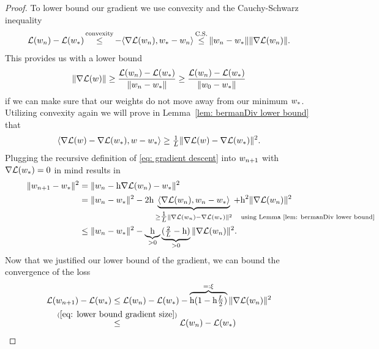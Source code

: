 \begin{proof}
	To lower bound our gradient we use convexity and the Cauchy-Schwarz inequality
	\begin{align*}
		\Loss(\weights_n)-\Loss(\minimum)
		\xle{\text{convexity}} -\langle \nabla\Loss(\weights_n), \minimum-\weights_n\rangle
		\xle{\text{C.S.}} \|\weights_n - \minimum\| \|\nabla\Loss(\weights_n)\|.
	\end{align*}
	This provides us with a lower bound 
	\begin{align}\label{eq: lower bound gradient size}
		\|\nabla\mathcal{L}(w)\|
		\ge \frac{\mathcal{L}(w_n)-\mathcal{L}(w_*)}{\|w_n-w_*\|}
		\ge \frac{\mathcal{L}(w_n)-\mathcal{L}(w_*)}{\|w_0-w_*\|}
	\end{align}
	if we can make sure that our weights do not move away from our minimum \(w_*\).
	Utilizing convexity again we will prove in Lemma~\ref{lem: bermanDiv lower
	bound} that
	\begin{align*}
		\langle\nabla\mathcal{L}(w) - \nabla\mathcal{L}(w_*), w-w_*\rangle
		\ge \tfrac1{L} \|\nabla\mathcal{L}(w) - \nabla\mathcal{L}(w_*)\|^2.
	\end{align*}
	Plugging the recursive definition of \ref{eq: gradient descent} into \(w_{n+1}\)
	with \(\nabla \mathcal{L}(w_*)=0\) in mind results in
	\begin{align}
		\nonumber
		\|\weights_{n+1} - \minimum\|^2
		&=\|\weights_n -\lr\nabla\Loss(\weights_n) - \minimum\|^2\\
		&= \|\weights_n - \minimum\|^2
		- 2\lr\underbrace{
			\langle \nabla\Loss(\weights_n), \weights_n - \minimum\rangle
		}_{
			\ge \tfrac{1}\ubound \|\nabla \Loss (\weights_n) - \nabla\Loss(\minimum)\|^2
			\mathrlap{\quad \text{using Lemma~\ref{lem: bermanDiv lower bound}}}
		} + \lr^2\|\nabla \Loss(\weights_n)\|^2
		\\
		&\le \|\weights_n - \minimum\|^2 - 
		\underbrace{\lr}_{>0}\underbrace{(\tfrac{2}{\ubound}-\lr)}_{>0}
		\|\nabla\Loss(\weights_n)\|^2.
		\label{eq: decreasing weight difference}
	\end{align}
	Now that we justified our lower bound of the gradient, we can bound the
	convergence of the loss
	\begin{align*}
		\Loss(\weights_{n+1}) - \Loss(\minimum)
		&\le \Loss(\weights_n)-\Loss(\minimum)
		- \overbrace{\lr(1-\lr\tfrac{\ubound}2)}^{=:\xi} \|\nabla \Loss(\weights_n)\|^2\\
		&\lxle{(\ref{eq: lower bound gradient size})}
		\Loss(\weights_n)-\Loss(\minimum)

\end{align*}
\end{proof}
